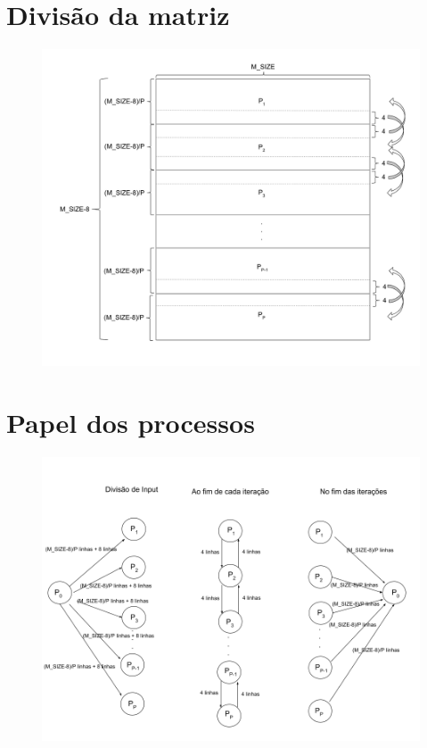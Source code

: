 \documentclass{article}
\begin{document}
\printbibliography

\newpage

\begin{appendix}

\section{Divisão da matriz}
\label{divMatrix}
\begin{figure}[H]
    \centering
    \includegraphics[width=15cm]{Pictures/matrixDraw.png}
\end{figure}


\section{Papel dos processos}
\label{procsMPI}
\begin{figure}[H]
    \centering
    \includegraphics[width=15cm]{Pictures/graphDraw.png}
\end{figure}



\end{appendix}
\end{document}
